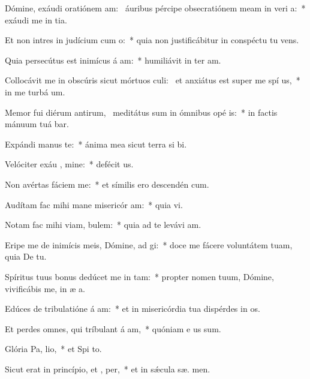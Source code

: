 \item Dómine, exáudi oratiónem am:~\pscross{} áuribus pércipe obsecratiónem meam in veri a:~* exáudi me in  tia.
\item Et non intres in judícium cum  o:~* quia non justificábitur in conspéctu tu  vens.
\item Quia persecútus est inimícus á am:~* humiliávit in ter  am.
\item Collocávit me in obscúris sicut mórtuos culi:~\pscross{} et anxiátus est super me spí us,~* in me turbá   um.
\item Memor fui diérum antirum,~\pscross{} meditátus sum in ómnibus opé is:~* in factis mánuum tuá bar.
\item Expándi manus   te:~* ánima mea sicut terra si  bi.
\item Velóciter exáu , mine:~* defécit  us.
\item Non avértas fáciem   me:~* et símilis ero descendén  cum.
\item Audítam fac mihi mane misericór am:~* quia   vi.
\item Notam fac mihi viam,   bulem:~* quia ad te levávi  am.
\item Eripe me de inimícis meis, Dómine, ad  gi:~* doce me fácere voluntátem tuam, quia De   tu.
\item Spíritus tuus bonus dedúcet me in  tam:~* propter nomen tuum, Dómine, vivificábis me, in æ a.
\item Edúces de tribulatióne á am:~* et in misericórdia tua dispérdes in os.
\item Et perdes omnes, qui tríbulant á am,~* quóniam e  us sum.
\item Glória Pa,  lio,~* et Spi to.
\item Sicut erat in princípio, et ,  per,~* et in sǽcula sæ. men.
